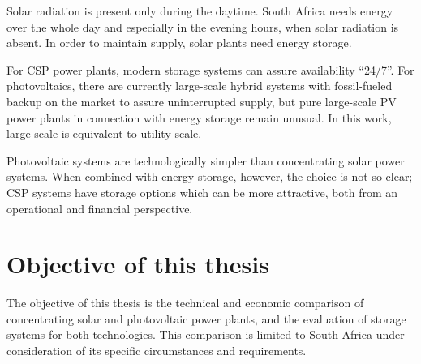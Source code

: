Solar radiation is present only during the daytime. South Africa needs energy over the whole day and especially in the evening hours, when solar radiation is absent. In order to maintain supply, solar plants need energy storage. 


For CSP power plants, modern storage systems can assure availability \enquote{24/7}. For photovoltaics, there are currently large-scale hybrid systems with fossil-fueled backup on the market \cite{BELECTRIC2015} to assure uninterrupted supply, but pure large-scale PV power plants in connection with energy storage remain unusual. In this work, large-scale is equivalent to utility-scale.


Photovoltaic systems are technologically simpler than concentrating solar power systems. When combined with energy storage, however, the choice is not so clear; CSP systems have storage options which can be more attractive, both from an operational and financial perspective.


\section{Objective of this thesis}

The objective of this thesis is the technical and economic comparison of concentrating solar and photovoltaic power plants, and the evaluation of storage systems for both technologies. This comparison is limited to South Africa under consideration of its specific circumstances and requirements.

